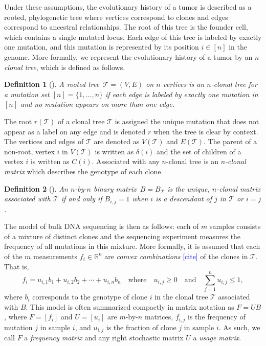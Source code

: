 \documentclass[10pt]{article}
\newtheorem{definition}{Definition}
\newcommand{\henri}[1]{\textcolor{blue}{[#1]}}
\newcommand{\tree}{\mathcal{T}}
\begin{document}
Under these assumptions, the evolutionary history of a tumor is described as a rooted, phylogenetic tree 
where vertices correspond to clones and edges correspond to ancestral 
relationships. The root of this tree is the founder cell, which contains a single mutated locus. 
Each edge of this tree is labeled by exactly one mutation, and this mutation is represented by its 
position $i \in [n]$ in the genome. More formally, we represent the evolutionary history of a tumor by an 
\emph{$n$-clonal tree}, which is defined as follows.

\begin{definition}[\cite{el-kebir_reconstruction_2015}]
  A rooted tree $\,\tree = (V, E)$ on $n$ vertices is an $n$-clonal tree 
  for a mutation set $[n] = \{1, \ldots, n\}$ if each edge is
  labeled by exactly one mutation in $[n]$ and no mutation appears
  on more than one edge.
\end{definition}

The root $r(\tree)$ of a clonal tree $\tree$ is assigned the unique 
mutation that does not appear as a label on any edge and is denoted
$r$ when the tree is clear by context. The vertices and edges of $\tree$ are denoted as $V(\tree)$ and $E(\tree)$.
The parent of a non-root, vertex $i$ in $V(\tree)$ is written as $\delta(i)$ and the set of children of a vertex $i$ 
is written as $C(i)$. Associated with any $n$-clonal tree is an \emph{$n$-clonal matrix}
which describes the genotype of each clone. 

\begin{definition}[\cite{el-kebir_reconstruction_2015}]
    An $n$-by-$n$ binary matrix $\,B = B_{\tree}$ is the unique, $n$-clonal matrix associated with $\tree$ 
  if and only if $B_{i, j} = 1$ when $i$ is a descendant of $j$ in $\tree$ or 
  $i = j$.
\end{definition}

The model of bulk DNA sequencing is then as follows: each of $m$ samples 
consists of a mixture of distinct clones and the sequencing experiment measures the 
frequency of all mutations in this mixture. More formally, it is assumed that 
each of the $m$ measurements $f_i \in \mathbb{R}^n$ are \emph{convex combinations} \henri{cite} of the clones
in $\tree$. That is,
\begin{equation}
    \label{eq:dna_seq_model}
f_i = u_{i,1}b_1 + u_{i,2}b_2 + \cdots + u_{i,n}b_n \quad\text{where}\quad u_{i, j} \geq 0 \quad\text{and}\quad \sum_{j=1}^nu_{i, j} \leq 1,
\end{equation}
where $b_i$ corresponds to the genotype of clone $i$ in the clonal tree $\tree$ associated with $B$.
This model is often summarized compactly in matrix notation as $F = UB$, where $F = [f_i]$ and $U = [u_i]$ are $m$-by-$n$ matrices, 
$f_{i,j}$ is the frequency of mutation $j$ in sample $i$, and $u_{i,j}$ is the fraction of clone $j$ in sample $i$. As such, we
call $F$ a \emph{frequency matrix} and any right stochastic matrix $U$ a \emph{usage matrix}.
\end{document}
